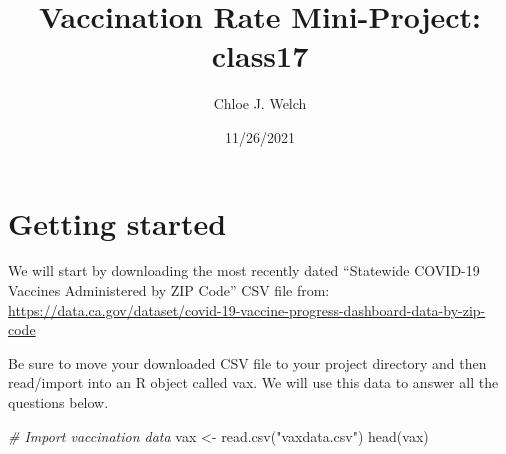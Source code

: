 \documentclass[
]{article}
\title{Vaccination Rate Mini-Project: class17}
\author{Chloe J. Welch}
\date{11/26/2021}
\newenvironment{Shaded}{\begin{snugshade}}{\end{snugshade}}
\newcommand{\CommentTok}[1]{\textcolor[rgb]{0.56,0.35,0.01}{\textit{#1}}}
\newcommand{\FunctionTok}[1]{\textcolor[rgb]{0.00,0.00,0.00}{#1}}
\newcommand{\NormalTok}[1]{#1}
\newcommand{\OtherTok}[1]{\textcolor[rgb]{0.56,0.35,0.01}{#1}}
\newcommand{\StringTok}[1]{\textcolor[rgb]{0.31,0.60,0.02}{#1}}
\begin{document}
\maketitle

\hypertarget{getting-started}{%
\section{Getting started}\label{getting-started}}

We will start by downloading the most recently dated ``Statewide
COVID-19 Vaccines Administered by ZIP Code'' CSV file from:
\url{https://data.ca.gov/dataset/covid-19-vaccine-progress-dashboard-data-by-zip-code}

Be sure to move your downloaded CSV file to your project directory and
then read/import into an R object called vax. We will use this data to
answer all the questions below.

\begin{Shaded}
\begin{Highlighting}[]
\CommentTok{\# Import vaccination data}
\NormalTok{vax }\OtherTok{\textless{}{-}} \FunctionTok{read.csv}\NormalTok{(}\StringTok{"vaxdata.csv"}\NormalTok{)}
\FunctionTok{head}\NormalTok{(vax)}
\end{Highlighting}
\end{Shaded}
\end{document}

